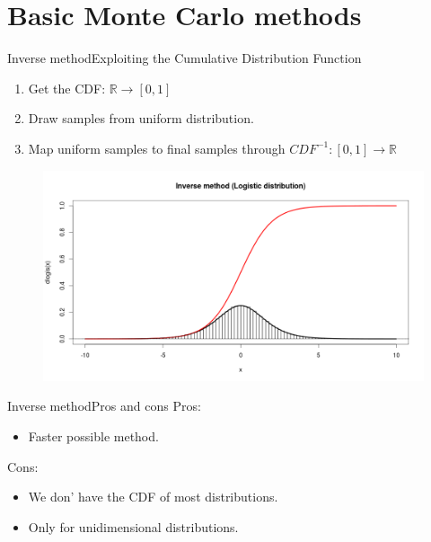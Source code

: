 \documentclass{beamer}
\begin{document}
\section{Basic Monte Carlo methods}
\begin{frame}{Inverse method}{Exploiting the Cumulative Distribution Function}

	\begin{enumerate}
		\item Get the CDF: $\mathbb{R} \rightarrow [0,1]$ 
		\item Draw samples from uniform distribution.
		\item Map uniform samples to final samples through $CDF^{-1}: [0,1] \rightarrow \mathbb{R}$ 
	\end{enumerate}
	\begin{figure}
		\centering
		\includegraphics[width=\textwidth]{inverse.png}
	\end{figure}
\end{frame}

\begin{frame}{Inverse method}{Pros and cons}
	Pros:
		\begin{itemize}
			\item Faster possible method.
		\end{itemize}
	Cons:
	\begin{itemize}
		\item We don' have the CDF of most distributions.
		\item Only for unidimensional distributions.
	\end{itemize}

\end{frame}
\end{document}
